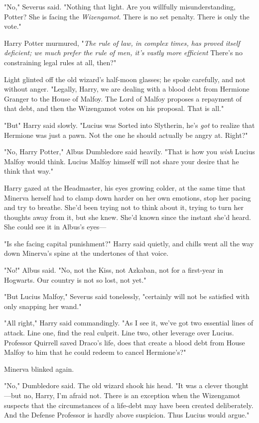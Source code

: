 "No," Severus said. "Nothing that light. Are you willfully misunderstanding,
Potter? She is facing the \emph{Wizengamot}. There is no set penalty. There is
only the vote."

Harry Potter murmured, "\emph{The rule of law, in complex times, has proved
itself deficient; we much prefer the rule of men, it's vastly more
efficient{\el}} There's no constraining legal rules at all, then?"

Light glinted off the old wizard's half-moon glasses; he spoke carefully, and
not without anger. "Legally, Harry, we are dealing with a blood debt from
Hermione Granger to the House of Malfoy. The Lord of Malfoy proposes a
repayment of that debt, and then the Wizengamot votes on his proposal. That is
all."

"But{\el}" Harry said slowly. "Lucius was Sorted into Slytherin, he's
\emph{got} to realize that Hermione was just a pawn. Not the one he should
actually be angry at. Right?"

"No, Harry Potter," Albus Dumbledore said heavily. "That is how you \emph{wish}
Lucius Malfoy would think. Lucius Malfoy himself{\el} will not share your
desire that he think that way."

Harry gazed at the Headmaster, his eyes growing colder, at the same time that
Minerva herself had to clamp down harder on her own emotions, stop her pacing
and try to breathe. She'd been trying not to think about it, trying to turn her
thoughts away from it, but she knew. She'd known since the instant she'd heard.
She could see it in Albus's eyes\mbox{---}

"Is she facing capital punishment?" Harry said quietly, and chills went all the
way down Minerva's spine at the undertones of that voice.

"No!" Albus said. "No, not the Kiss, not Azkaban, not for a first-year in
Hogwarts. Our country is not so lost, not yet."

"But Lucius Malfoy," Severus said tonelessly, "certainly will not be satisfied
with only snapping her wand."

"All right," Harry said commandingly. "As I see it, we've got two essential
lines of attack. Line one, find the real culprit. Line two, other leverage over
Lucius. Professor Quirrell saved Draco's life, does that create a blood debt
from House Malfoy to him that he could redeem to cancel Hermione's?"

Minerva blinked again.

"No," Dumbledore said. The old wizard shook his head. "It was a clever
thought---but no, Harry, I'm afraid not. There is an exception when the
Wizengamot suspects that the circumstances of a life-debt may have been created
deliberately. And the Defense Professor is hardly above suspicion. Thus Lucius
would argue."

